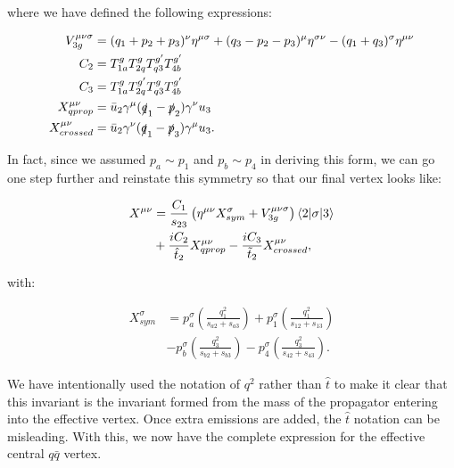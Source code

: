 where we have defined the following expressions:

\begin{subequations}
\begin{align}
V_{3g}^{\mu \nu \sigma} &= (q_1 + p_2 + p_3)^\nu \eta^{\mu \sigma} + (q_3 - p_2 -p_3)^\mu \eta^{\sigma \nu} - (q_1 + q_3)^\sigma \eta^{\mu \nu} \\
C_2 &= T^g_{1a}T^g_{2q}T^{g'}_{q3}T^{g'}_{4b} \\
C_3 &= T^g_{1a}T^{g'}_{2q}T^g_{q3}T^{g'}_{4b} \\
X_{qprop}^{\mu \nu} &= \bar{u}_2 \gamma^\mu (\slashed{q}_1 - \slashed{p}_2)\gamma^\nu u_3 \\
X_{crossed}^{\mu \nu} &=\bar{u}_2 \gamma^\nu (\slashed{q}_1 - \slashed{p}_3)\gamma^\mu u_3.
\end{align}
\end{subequations}

In fact, since we assumed $p_a \sim p_1$ and $p_b \sim p_4$ in deriving this form, we can go one step further and reinstate this symmetry so that our final vertex looks like:

\begin{equation}
\begin{split}
X^{\mu \nu} &= \frac{C_1}{s_{23}} \left(\eta^{\mu \nu} X_{sym}^\sigma + V^{\mu \nu \sigma}_{3g} \right) \mathinner{\langle2\vert\sigma\vert3\rangle}_{} \\
&+ \frac{i C_2}{\hat{t}_2} X^{\mu \nu}_{qprop} - \frac{i C_3}{\tilde{t}_2} X^{\mu \nu}_{crossed},
\end{split}
\end{equation}

with:

\begin{equation}
\begin{split}
X_{sym}^\sigma &= p_a^\sigma \left( \frac{q_1^2}{s_{a2}+s_{a3}} \right) + p_1^\sigma \left( \frac{q_1^2}{s_{12}+s_{13}} \right) \\
&- p_b^\sigma \left( \frac{q_3^2}{s_{b2}+s_{b3}} \right) - p_4^\sigma \left( \frac{q_3^2}{s_{42}+s_{43}} \right).
\end{split}
\end{equation}

We have intentionally used the notation of $q^2$ rather than $\hat{t}$ to make it clear that this invariant is the invariant formed from the mass of the propagator entering into the effective vertex. Once extra emissions are added, the $\hat{t}$ notation can be misleading. With this, we now have the complete expression for the effective central $q\bar{q}$ vertex. 

